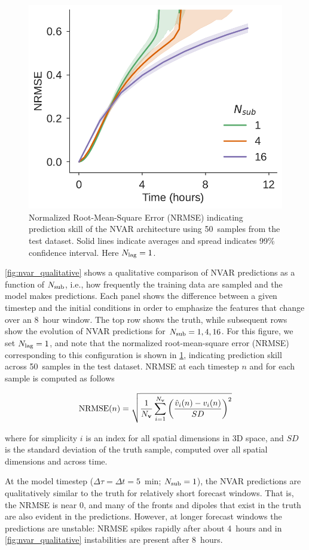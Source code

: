 \begin{figure}
    \centering
    \includegraphics[width=.4\textwidth]{../figures/nvar_nrmse.pdf}
    \caption{Normalized Root-Mean-Square Error (NRMSE)
        indicating prediction skill of the NVAR
        architecture using 50~samples from the test dataset.
        Solid lines indicate averages and spread indicates 99\% confidence
        interval.
        Here $N_\text{lag}=1$.
    }
    \label{fig:nvar_nrmse}
\end{figure}

\cref{fig:nvar_qualitative} shows a qualitative comparison of NVAR predictions
as a function of $N_\text{sub}$, i.e., how frequently the training data are sampled and
the model makes predictions.
Each panel shows the difference between a given timestep and the initial
conditions in order to emphasize the features that change over an 8~hour window.
The top row shows the truth, while subsequent rows show the evolution of NVAR
predictions for $N_\text{sub}=1,4,16$.
For this figure, we set $N_\text{lag}=1$, and note that the normalized root-mean-square
error (NRMSE) corresponding to this configuration is shown in
\cref{fig:nvar_nrmse},
indicating prediction skill across 50~samples in the test dataset.
NRMSE at each timestep $n$ and for each sample is computed as follows
\begin{linenomath*}\begin{equation}
    \text{NRMSE}(n) = \sqrt{\dfrac{1}{N_{\mathbf{v}}}\sum_{i=1}^{N_{\mathbf{v}}}\left(
        \dfrac{\hat{v}_i(n) - v_i(n)}{SD}
        \right)^2 }
\end{equation}\end{linenomath*}
where for simplicity $i$ is an index for all spatial dimensions in 3D space,
and $SD$ is the standard deviation of the truth sample, computed over all
spatial dimensions and across time.

At the model timestep ($\Delta \tau = \Delta t = 5$~min; $N_\text{sub}=1$), the NVAR predictions are
qualitatively similar to the truth for relatively short forecast windows.
That is, the NRMSE is near 0, and
many of the fronts and dipoles that exist in the truth are also evident
in the predictions.
However, at longer forecast windows the predictions are unstable: NRMSE spikes
rapidly after about 4~hours and in \cref{fig:nvar_qualitative} instabilities are
present after 8~hours.

